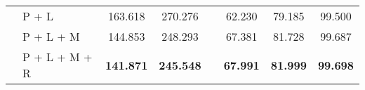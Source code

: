 \begin{table}[t!]
\begin{tabular}[ht]{clcccccc}
\multicolumn{1}{l}{}                       & P + L                                       & 163.618                & 270.276                &  & 62.230          & 79.185          & 99.500          \\
\multicolumn{1}{l}{}                       & P + L + M                                   & 144.853                & 248.293                &  & 67.381          & 81.728          & 99.687          \\
\multicolumn{1}{l}{}                       & P + L + M + R                               & \textbf{141.871}       & \textbf{245.548}       &  & \textbf{67.991} & \textbf{81.999} & \textbf{99.698} \\ \hline
\end{tabular}
\label{table:ablation_1}
\vspace{-0.4cm}
\end{table}
















